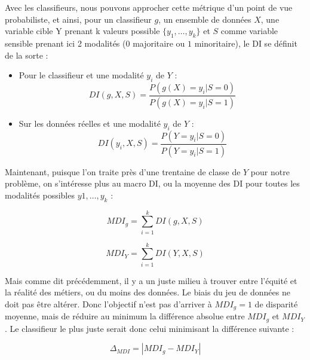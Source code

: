 Avec les classifieurs, nous pouvons approcher cette métrique d’un point de vue probabiliste, et ainsi, pour un classifieur $g$, un ensemble de données $X$, une variable cible Y prenant k valeurs possible $\{y_1, \dots , y_k\}$ et $S$ comme variable sensible prenant ici 2 modalités ($0$ majoritaire ou $1$ minoritaire), le DI se définit de la sorte :
\newline

\begin{itemize}
\item Pour le classifieur et une modalité $y_i$ de $Y$ :
$$DI(g, X, S) = \frac{P(g(X) = y_i | S=0)}{P(g(X) = y_i | S=1)}$$ 

\item Sur les données réelles et une modalité $y_i$ de $Y$ :
$$DI(y_i, X, S) = \frac{P(Y = y_i | S=0)}{P(Y = y_i | S=1)}$$
\end{itemize}

Maintenant, puisque l'on traite près d'une trentaine de classe de $Y$ pour notre problème, on s'intéresse plus au macro DI, ou la moyenne des DI pour toutes les modalités possibles $y1, \dots, y_k$ :

$$
MDI_{g} = \sum_{i=1}^{k} DI(g, X, S)
$$

$$
MDI_{Y} = \sum_{i=1}^{k} DI(Y, X, S)
$$

Mais comme dit précédemment, il y a un juste milieu à trouver entre l’équité et la réalité des métiers, ou du moins des données. Le biais du jeu de données ne doit pas être altérer. Donc l’objectif n’est pas d’arriver à $MDI_{g} = 1$ de disparité moyenne, mais de réduire au minimum la différence absolue entre $MDI_{g}$ et $MDI_{Y}$. Le classifieur le plus juste serait donc celui minimisant la différence suivante :

$$ \Delta_{MDI} = | MDI_{g}- MDI_{Y} | $$



